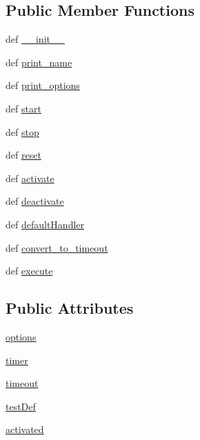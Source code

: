 \subsection*{Public Member Functions}
\begin{DoxyCompactItemize}
\item 
def \hyperlink{classWatchdog_1_1Watchdog_aa1f4dbdbd309300a402765a051ec0a53}{\-\_\-\-\_\-init\-\_\-\-\_\-}
\item 
def \hyperlink{classWatchdog_1_1Watchdog_a9b6386067421696fd9ff0f3aea52c9a4}{print\-\_\-name}
\item 
def \hyperlink{classWatchdog_1_1Watchdog_a5368c099a18a43a367ca38191d7286f7}{print\-\_\-options}
\item 
def \hyperlink{classWatchdog_1_1Watchdog_a0ddb7a85fbdad4cff3af0fe3628098f7}{start}
\item 
def \hyperlink{classWatchdog_1_1Watchdog_af56d743f19894122322a238de2bb36c7}{stop}
\item 
def \hyperlink{classWatchdog_1_1Watchdog_ae4c28ad104e774e68874a3129762ae8c}{reset}
\item 
def \hyperlink{classWatchdog_1_1Watchdog_a3d832cad81328a1c259015e8c68c16d9}{activate}
\item 
def \hyperlink{classWatchdog_1_1Watchdog_a2d1d443fe10d34903950dabb8d54ca67}{deactivate}
\item 
def \hyperlink{classWatchdog_1_1Watchdog_ac8a0d09157f34dc021ffc0753750cfc9}{default\-Handler}
\item 
def \hyperlink{classWatchdog_1_1Watchdog_ad7d2edaf53bf4fa24061d88448fea058}{convert\-\_\-to\-\_\-timeout}
\item 
def \hyperlink{classWatchdog_1_1Watchdog_a2d051635bc61c3f75ea7c2fbeed426b5}{execute}
\end{DoxyCompactItemize}
\subsection*{Public Attributes}
\begin{DoxyCompactItemize}
\item 
\hyperlink{classWatchdog_1_1Watchdog_a5ceb06fde29b89623d7a230ae080abe6}{options}
\item 
\hyperlink{classWatchdog_1_1Watchdog_ae03efeba550ed8039ab79a8414b8be82}{timer}
\item 
\hyperlink{classWatchdog_1_1Watchdog_a62dc7dad113fcda93fe4f8855ac037db}{timeout}
\item 
\hyperlink{classWatchdog_1_1Watchdog_abc547688f9ff2ab9350b028c6f122997}{test\-Def}
\item 
\hyperlink{classWatchdog_1_1Watchdog_ab78c4b2339ad2efec784a3df0a5f37d6}{activated}
\end{DoxyCompactItemize}


